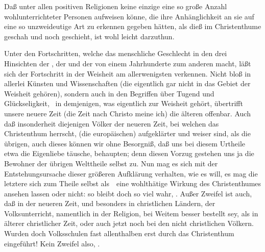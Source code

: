 \begin{aufza}
\item Daß unter allen positiven Religionen keine einzige eine so große Anzahl wohlunterrichteter Personen aufweisen könne, die ihre Anhänglichkeit an sie auf eine so unzweideutige Art zu erkennen gegeben hätten, als dieß im Christenthume geschah und noch geschieht, ist wohl leicht darzuthun.
\begin{aufzb}
\item Unter den Fortschritten, welche das menschliche Geschlecht in den drei Hinsichten der , der  und der  von einem Jahrhunderte zum anderen macht, läßt sich der Fortschritt in der Weisheit am allerwenigsten verkennen. Nicht bloß in allerlei Künsten und Wissenschaften (die eigentlich gar nicht in das Gebiet der Weisheit gehören), sondern auch in den Begriffen über Tugend und Glückseligkeit, \dh\ in demjenigen, was eigentlich zur Weisheit gehört, übertrifft unsere neuere Zeit (die Zeit nach Christo meine ich) die älteren offenbar. Auch daß insonderheit diejenigen Völker der neueren Zeit, bei welchen das Christenthum herrscht, (die europäischen) aufgeklärter und weiser sind, als die übrigen, auch dieses können wir ohne Besorgniß, daß uns bei diesem Urtheile etwa die Eigenliebe täusche, behaupten; denn diesen Vorzug gestehen uns ja die Bewohner der übrigen Welttheile selbst zu. Nun mag es sich mit der Entstehungsursache dieser größeren Aufklärung verhalten, wie es will, es mag die letztere sich zum Theile selbst als~\ eine wohlthätige Wirkung des Christenthumes ansehen lassen oder nicht: so bleibt doch so viel wahr, . Außer Zweifel ist auch, daß in der neueren Zeit, und besonders in christlichen Ländern, der Volksunterricht, namentlich in der Religion, bei Weitem besser bestellt sey, als in älterer christlicher Zeit, oder auch jetzt noch bei den nicht christlichen Völkern. Wurden doch Volksschulen fast allenthalben erst durch das Christenthum eingeführt! Kein Zweifel also, .

\end{aufzb}
\end{aufza}
